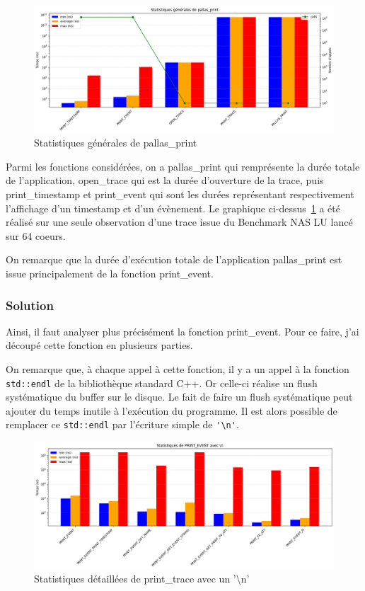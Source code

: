 \begin{figure}[!h]
    \centering
    \includegraphics[width=1\textwidth]{img/pallas_print_gen.png}
    \caption{Statistiques générales de pallas\_print}
    \label{fig:pallas_print}
\end{figure}

Parmi les fonctions considérées, on a pallas\_print qui remprésente la durée totale de l'application, open\_trace qui est la durée d'ouverture de la trace,
puis print\_timestamp et print\_event qui sont les durées représentant respectivement l'affichage d'un timestamp et d'un évènement.
Le graphique ci-dessus~\ref{fig:pallas_print} a été réalisé sur une seule observation d'une trace issue du Benchmark NAS LU lancé sur 64 coeurs.

On remarque que la durée d'exécution totale de l'application pallas\_print est issue principalement de la fonction print\_event.

\subsubsection{Solution}\label{ssec:pallas_print_sol}

Ainsi, il faut analyser plus précisément la fonction print\_event.
Pour ce faire, j'ai découpé cette fonction en plusieurs parties. 

On remarque que, à chaque appel à cette fonction, il y a un appel à la fonction \verb!std::endl! de la bibliothèque standard C++. Or celle-ci réalise un flush systématique du buffer sur le disque.
Le fait de faire un flush systématique peut ajouter du temps inutile à l'exécution du programme.
Il est alors possible de remplacer ce \verb!std::endl! par l'écriture simple de \verb!'\n'!.


\begin{figure}[!h]
    \centering
    \includegraphics[width=1\textwidth]{img/print_event_n.png}
    \caption{Statistiques détaillées de print\_trace avec un '\textbackslash n'}
    \label{fig:print_event_n}
\end{figure}


